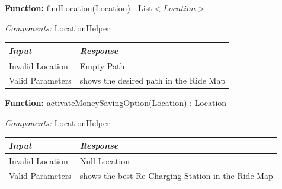 \documentclass[a4paper]{article}
\begin{document}
\textbf{Function:} findLocation(Location) : List\(<Location>\) \par
\textit{Components:} LocationHelper
\begin{center}
\begin{tabular}{ | L{6cm} | L{6cm} | }
\hline
	\textit{Input}& \textit{Response}\\ \hline
	Invalid Location & Empty Path\\ \hline
	Valid Parameters & shows the desired path in the Ride Map\\ \hline
\end{tabular}
\end{center}
\newpage

\textbf{Function:} activateMoneySavingOption(Location) : Location \par
\textit{Components:} LocationHelper
\begin{center}
\begin{tabular}{ | L{6cm} | L{6cm} | }
\hline
	\textit{Input}& \textit{Response}\\ \hline
	Invalid Location & Null Location\\ \hline
	Valid Parameters & shows the best Re-Charging Station in the Ride Map\\ \hline
\end{tabular}
\end{center}
\end{document}
